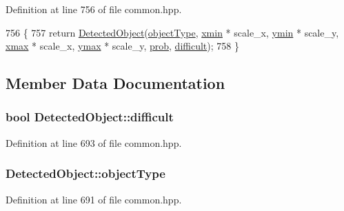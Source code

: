 Definition at line 756 of file common.\+hpp.


\begin{DoxyCode}
756                                                              \{
757         \textcolor{keywordflow}{return} \hyperlink{classDetectedObject_af8bb6bc4a124e4602c4b6d4617a0079e}{DetectedObject}(\hyperlink{classDetectedObject_aff19c53a4ee1d27656acf6b6fbd9cfa0}{objectType}, \hyperlink{classDetectedObject_af6a124efdbada32ae6cc6ed8207957ba}{xmin} * scale\_x, 
      \hyperlink{classDetectedObject_a18ef6bb15e7c47d41d9c2c9d4b8b133c}{ymin} * scale\_y, \hyperlink{classDetectedObject_a8e120d3f08cb0f6c41b10a082bd0df04}{xmax} * scale\_x, \hyperlink{classDetectedObject_ab130fc061e711904966077c8b8e294e7}{ymax} * scale\_y, \hyperlink{classDetectedObject_a1d49d73edce36d93ee88b202bdcb961d}{prob}, \hyperlink{classDetectedObject_a11e8106cf6abc1bab40e292001930fa2}{difficult});
758     \}
\end{DoxyCode}


\subsection{Member Data Documentation}
\subsubsection[{\texorpdfstring{difficult}{difficult}}]{\setlength{\rightskip}{0pt plus 5cm}bool Detected\+Object\+::difficult}\hypertarget{classDetectedObject_a11e8106cf6abc1bab40e292001930fa2}{}\label{classDetectedObject_a11e8106cf6abc1bab40e292001930fa2}


Definition at line 693 of file common.\+hpp.

\subsubsection[{\texorpdfstring{object\+Type}{objectType}}]{ Detected\+Object\+::object\+Type}\hypertarget{classDetectedObject_aff19c53a4ee1d27656acf6b6fbd9cfa0}{}\label{classDetectedObject_aff19c53a4ee1d27656acf6b6fbd9cfa0}


Definition at line 691 of file common.\+hpp.

